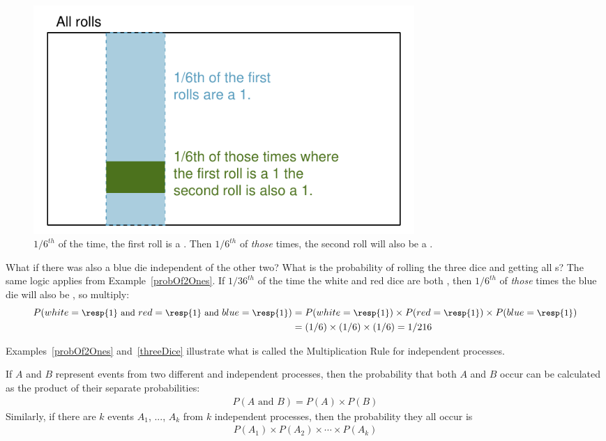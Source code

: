 \begin{figure}[hht]
\centering
\includegraphics[width=0.7\textwidth]{ch_probability/figures/indepForRollingTwo1s/indepForRollingTwo1s}
\caption{$1/6^{th}$ of the time, the first roll is a . Then $1/6^{th}$ of \emph{those} times, the second roll will also be a .}
\label{indepForRollingTwo1s}
\end{figure}

\begin{example}{What if there was also a blue die independent of the other two? What is the probability of rolling the three dice and getting all s?}\label{threeDice}
The same logic applies from Example~\ref{probOf2Ones}. If $1/36^{th}$ of the time the white and red dice are both , then $1/6^{th}$ of \emph{those} times the blue die will also be , so multiply:
{\begin{align*}
P(white=\text{\small\resp{1} and } red=\text{\small\resp{1} and } blue=\text{\small\resp{1}})
	&= P(white=\text{\small\resp{1}})\times P(red=\text{\small\resp{1}})\times P(blue=\text{\small\resp{1}}) \\
	&= (1/6)\times (1/6)\times (1/6)
	= 1/216
\end{align*}} \vspace{-7mm}
\end{example}

Examples~\ref{probOf2Ones} and~\ref{threeDice} illustrate what is called the Multiplication Rule for independent processes.

\begin{termBox}{
If $A$ and $B$ represent events from two different and independent processes, then the probability that both $A$ and $B$ occur can be calculated as the product of their separate probabilities: \vspace{-1.5mm}
\begin{eqnarray}\label{eqForIndependentEvents}
P(A \text{ and }B) = P(A) \times  P(B)
\end{eqnarray}
Similarly, if there are $k$ events $A_1$, ..., $A_k$ from $k$ independent processes, then the probability they all occur is\vspace{-1.5mm}
\begin{eqnarray*}
P(A_1) \times  P(A_2)\times  \cdots \times  P(A_k)
\end{eqnarray*}\vspace{-6mm}}
\end{termBox}


